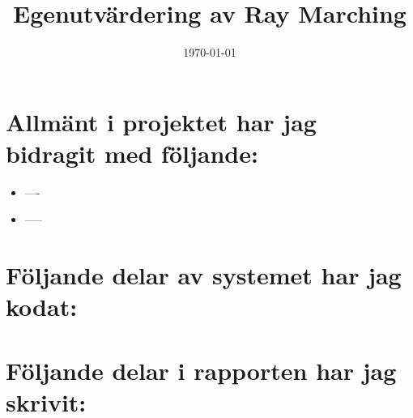 \documentclass{article}
\title{Egenutvärdering av Ray Marching}
\author{}
\date{\today}
\begin{document}
\maketitle
\setcounter{secnumdepth}{0}
\section{Allmänt i projektet har jag bidragit med följande:}
\begin{itemize}
\item ----
\item -----
\end{itemize}

\section{Följande delar av systemet har jag kodat:}

\section{Följande delar i rapporten har jag skrivit:}
\end{document}
